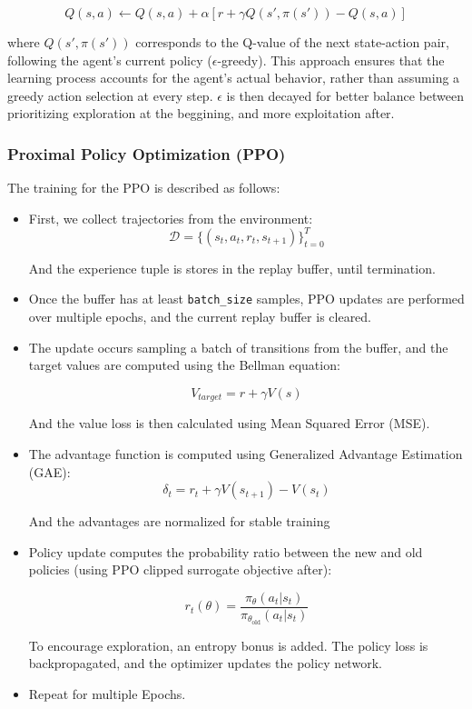 \documentclass[../CSC_52081_EP.tex]{subfiles}
\begin{document}
\begin{equation}
        Q(s, a) \leftarrow Q(s, a) + \alpha \left[ r + \gamma Q(s', \pi(s')) - Q(s, a) \right]
    \end{equation}

where $Q(s', \pi(s'))$ corresponds to the Q-value of the next state-action pair, following the agent’s current policy ($\epsilon$-greedy). This approach ensures that the learning process accounts for the agent’s actual behavior, rather than assuming a greedy action selection at every step. $\epsilon$ is then decayed for better balance between prioritizing exploration at the beggining, and more exploitation after.

\hspace{1cm}

\subsubsection{Proximal Policy Optimization (PPO)}
The training for the PPO is described as follows:

\begin{itemize}
    \item First, we collect trajectories from the environment:
    \[
    \mathcal{D} = \{ (s_t, a_t, r_t, s_{t+1}) \}_{t=0}^{T}
    \]

    And the experience tuple is stores in the replay buffer, until termination.

    \item Once the buffer has at least \verb|batch_size| samples, PPO updates are performed over multiple epochs, and the current replay buffer is cleared.

    \item The update occurs sampling a batch of transitions from the buffer, and the target values are computed using the Bellman equation:

    \begin{equation}
        V_{target} = r + \gamma V(s)
    \end{equation}

    And the value loss is then calculated using Mean Squared Error (MSE).
    
    \item The advantage function is computed using Generalized Advantage Estimation (GAE):
    \[
    \delta_t = r_t + \gamma V(s_{t+1}) - V(s_t)
    \]
    
    And the advantages are normalized for stable training

    \item Policy update computes the probability ratio between the new and old policies (using PPO clipped surrogate objective after):

    \[
    r_t(\theta) = \frac{\pi_{\theta}(a_t | s_t)}{\pi_{\theta_{\text{old}}}(a_t | s_t)}
    \]

    To encourage exploration, an entropy bonus is added. The policy loss is backpropagated, and the optimizer updates the policy network.

    \item Repeat for multiple Epochs.
    
\end{itemize}
\end{document}
